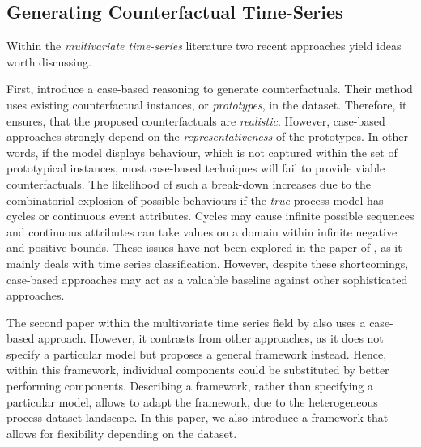 \documentclass[./../../paper.tex]{subfiles}
\begin{document}
\subsection{Generating Counterfactual Time-Series}
Within the \emph{multivariate time-series} literature two recent approaches yield ideas worth discussing.

First, \citeauthor{delaney_InstanceBasedCounterfactualExplanations_2021} introduce a case-based reasoning to generate counterfactuals\cite{delaney_InstanceBasedCounterfactualExplanations_2021}. Their method uses existing counterfactual instances, or \emph{prototypes}, in the dataset. Therefore, it ensures, that the proposed counterfactuals are \emph{realistic}. However, case-based approaches strongly depend on the \emph{representativeness} of the prototypes\cite[p. 192]{molnar2019}. In other words, if the model displays behaviour, which is not captured within the set of prototypical instances, most case-based techniques will fail to provide viable counterfactuals. The likelihood of such a break-down increases due to the combinatorial explosion of possible behaviours if the \emph{true} process model has cycles or continuous event attributes. Cycles may cause infinite possible sequences and continuous attributes can take values on a domain within infinite negative and positive bounds. These issues have not been explored in the paper of \citeauthor{delaney_InstanceBasedCounterfactualExplanations_2021}, as it mainly deals with time series classification\cite{delaney_InstanceBasedCounterfactualExplanations_2021}. However, despite these shortcomings, case-based approaches may act as a valuable baseline against other sophisticated approaches.

The second paper within the multivariate time series field by \citeauthor{ates_CounterfactualExplanationsMultivariate_2021} also uses a case-based approach\cite{ates_CounterfactualExplanationsMultivariate_2021}. However, it contrasts from other approaches, as it does not specify a particular model but proposes a general framework instead. Hence, within this framework, individual components could be substituted by better performing components. Describing a framework, rather than specifying a particular model, allows to adapt the framework, due to the heterogeneous process dataset landscape. In this paper, we also introduce a framework that allows for flexibility depending on the dataset. 
\end{document}
